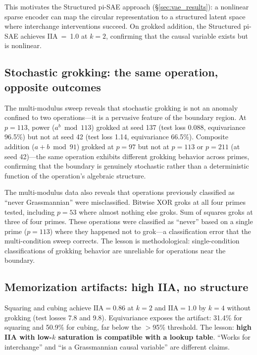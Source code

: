 \documentclass{article}
\newcommand{\IIA}{\mathrm{IIA}}
\begin{document}
This motivates the Structured pi-SAE approach (\S\ref{sec:vae_results}):
a nonlinear sparse encoder can map the circular representation to a structured
latent space where interchange interventions succeed. On grokked addition, the
Structured pi-SAE achieves IIA~=~1.0 at $k{=}2$, confirming that the causal
variable exists but is nonlinear.

\subsection{Stochastic grokking: the same operation, opposite outcomes}
\label{sec:stochastic}

The multi-modulus sweep reveals that stochastic grokking is not an anomaly
confined to two operations---it is a pervasive feature of the boundary region.
At $p{=}113$, power ($a^b \bmod 113$) grokked at seed 137 (test loss 0.088,
equivariance 96.5\%) but not at seed 42 (test loss 1.14, equivariance 66.5\%).
Composite addition ($a + b \bmod 91$) grokked at $p{=}97$ but not at
$p{=}113$ or $p{=}211$ (at seed 42)---the same operation exhibits different
grokking behavior across primes, confirming that the boundary is genuinely
stochastic rather than a deterministic function of the operation's algebraic
structure.

The multi-modulus data also reveals that operations previously classified as
``never Grassmannian'' were misclassified. Bitwise XOR groks at all four
primes tested, including $p{=}53$ where almost nothing else groks. Sum of
squares groks at three of four primes. These operations were classified as
``never'' based on a single prime ($p{=}113$) where they happened not to
grok---a classification error that the multi-condition sweep corrects.
The lesson is methodological: single-condition classifications of grokking
behavior are unreliable for operations near the boundary.

\subsection{Memorization artifacts: high IIA, no structure}
\label{sec:memorization}

Squaring and cubing achieve $\IIA = 0.86$ at $k = 2$ and $\IIA = 1.0$ by $k = 4$
without grokking (test losses 7.8 and 9.8). Equivariance exposes the artifact:
31.4\% for squaring and 50.9\% for cubing, far below the $>$95\% threshold. The
lesson: \textbf{high IIA with low-$k$ saturation is compatible with a lookup
table}. ``Works for interchange'' and ``is a Grassmannian causal variable'' are
different claims.
\end{document}
